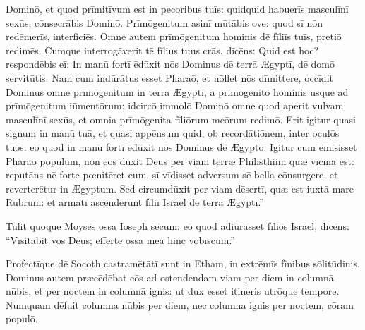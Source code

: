 Dominō, et quod prīmitīvum est in pecoribus tuīs: quidquid
habuerīs masculīnī sexūs, 
cōnsecrābis Dominō. Prīmōgenitum asinī mūtābis ove: quod sī nōn redēmerīs,
interficiēs. Omne autem prīmōgenitum hominis dē fīliīs tuīs, pretiō
redimēs. Cumque interrogāverit tē fīlius tuus crās, dīcēns: Quid est
hoc? respondēbis eī: In manū fortī ēdūxit nōs Dominus dē terrā Ægyptī, dē
domō servitūtis. Nam cum indūrātus esset
Pharaō, et nōllet nōs dīmittere, occīdit Dominus omne
prīmōgenitum in terrā Ægyptī, ā prīmōgenitō hominis usque
ad prīmōgenitum iūmentōrum: idcircō
immolō Dominō omne quod aperit vulvam
masculīnī sexūs, et omnia prīmōgenita fīliōrum meōrum
redimō. Erit igitur quasi signum in manū tuā, et quasi
appēnsum quid, ob
recordātiōnem, inter
oculōs tuōs: eō quod in manū fortī ēdūxit nōs Dominus dē Ægyptō. Igitur
cum ēmīsisset Pharaō populum, nōn eōs dūxit Deus per viam terræ Philisthiim
quæ vīcīna est: reputāns nē forte
pœnitēret eum, sī vīdisset adversum sē bella
cōnsurgere, et reverterētur in Ægyptum. Sed
circumdūxit per viam dēsertī, quæ est iuxtā mare Rubrum:
et armātī ascendērunt fīliī Isrāēl dē terrā Ægyptī.''

Tulit quoque Moysēs
ossa Ioseph sēcum: eō quod adiūrāsset fīliōs Isrāēl,
dīcēns: ``Vīsitābit vōs Deus;
effertē ossa mea hinc vōbīscum.''

Profectīque dē Socoth castramētātī sunt in Etham, in
extrēmīs fīnibus sōlitūdinis. Dominus autem præcēdēbat
eōs ad ostendendam viam per diem in columnā nūbis, et per noctem in columnā
ignis: ut dux esset itineris utrōque tempore. Numquam dēfuit columna
nūbis per diem, nec columna ignis per noctem, cōram populō. 
